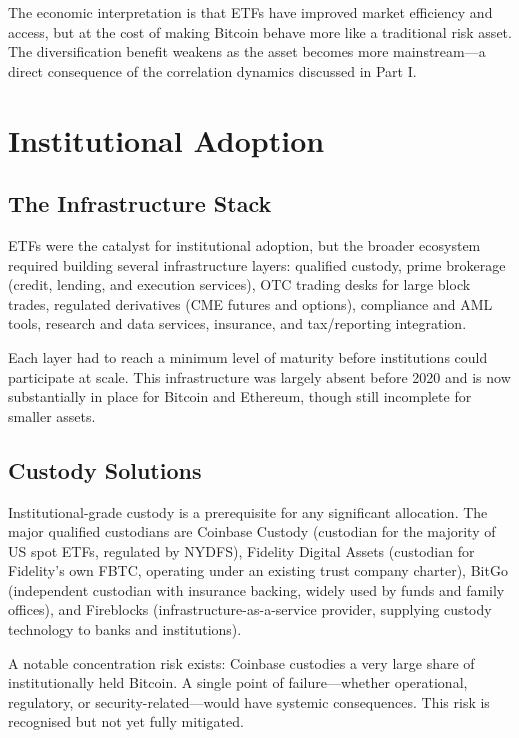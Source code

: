 \documentclass[11pt,a4paper]{article}
\begin{document}
The economic interpretation is that ETFs have improved market efficiency and access, but at the cost of making Bitcoin behave more like a traditional risk asset. The diversification benefit weakens as the asset becomes more mainstream---a direct consequence of the correlation dynamics discussed in Part I.

\section{Institutional Adoption}

\subsection{The Infrastructure Stack}

ETFs were the catalyst for institutional adoption, but the broader ecosystem required building several infrastructure layers: qualified custody, prime brokerage (credit, lending, and execution services), OTC trading desks for large block trades, regulated derivatives (CME futures and options), compliance and AML tools, research and data services, insurance, and tax/reporting integration.

Each layer had to reach a minimum level of maturity before institutions could participate at scale. This infrastructure was largely absent before 2020 and is now substantially in place for Bitcoin and Ethereum, though still incomplete for smaller assets.

\subsection{Custody Solutions}

Institutional-grade custody is a prerequisite for any significant allocation. The major qualified custodians are Coinbase Custody (custodian for the majority of US spot ETFs, regulated by NYDFS), Fidelity Digital Assets (custodian for Fidelity's own FBTC, operating under an existing trust company charter), BitGo (independent custodian with insurance backing, widely used by funds and family offices), and Fireblocks (infrastructure-as-a-service provider, supplying custody technology to banks and institutions).

A notable concentration risk exists: Coinbase custodies a very large share of institutionally held Bitcoin. A single point of failure---whether operational, regulatory, or security-related---would have systemic consequences. This risk is recognised but not yet fully mitigated.
\end{document}
